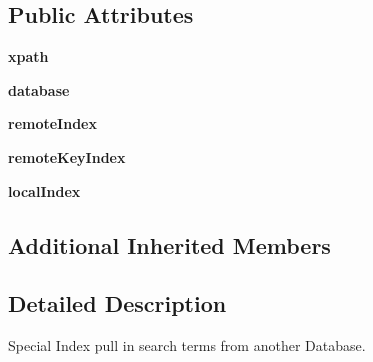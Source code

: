 \subsection*{Public Attributes}
\begin{DoxyCompactItemize}
\item 
\hypertarget{classcheshire3_1_1index_1_1_pass_through_index_ab100bcd033871c9ecbba7def8bcf3abe}{{\bfseries xpath}}\label{classcheshire3_1_1index_1_1_pass_through_index_ab100bcd033871c9ecbba7def8bcf3abe}

\item 
\hypertarget{classcheshire3_1_1index_1_1_pass_through_index_a7c4e027b4b027dc9db7c485fef003a1e}{{\bfseries database}}\label{classcheshire3_1_1index_1_1_pass_through_index_a7c4e027b4b027dc9db7c485fef003a1e}

\item 
\hypertarget{classcheshire3_1_1index_1_1_pass_through_index_a88fe0d5101b3221979cead194a8bc9e4}{{\bfseries remote\-Index}}\label{classcheshire3_1_1index_1_1_pass_through_index_a88fe0d5101b3221979cead194a8bc9e4}

\item 
\hypertarget{classcheshire3_1_1index_1_1_pass_through_index_a95a24b38265e508b22cf799f8cd66690}{{\bfseries remote\-Key\-Index}}\label{classcheshire3_1_1index_1_1_pass_through_index_a95a24b38265e508b22cf799f8cd66690}

\item 
\hypertarget{classcheshire3_1_1index_1_1_pass_through_index_a5e1caee40c2bdeeed7d5885bc63dddb0}{{\bfseries local\-Index}}\label{classcheshire3_1_1index_1_1_pass_through_index_a5e1caee40c2bdeeed7d5885bc63dddb0}

\end{DoxyCompactItemize}
\subsection*{Additional Inherited Members}


\subsection{Detailed Description}
\begin{DoxyVerb}Special Index pull in search terms from another Database.\end{DoxyVerb}
 

